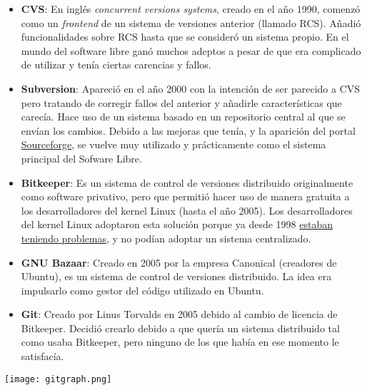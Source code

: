 \begin{itemize}
    \item \textbf{CVS}: En inglés \textit{concurrent versions systems}, creado en el año 1990, comenzó como un \textit{frontend} de un sistema de versiones anterior (llamado RCS). Añadió funcionalidades sobre RCS hasta que se consideró un sistema propio. En el mundo del software libre ganó muchos adeptos a pesar de que era complicado de utilizar y tenía ciertas carencias y fallos.

    \item \textbf{Subversion}: Apareció en el año 2000 con la intención de ser parecido a CVS pero tratando de corregir fallos del anterior y añadirle características que carecía. Hace uso de un sistema basado en un repositorio central al que se envían los cambios. Debido a las mejoras que tenía, y la aparición del portal \href{https://sourceforge.net/}{Sourceforge}, se vuelve muy utilizado y prácticamente como el sistema principal del Sofware Libre.

    \item \textbf{Bitkeeper}: Es un sistema de control de versiones distribuido originalmente como software privativo, pero que permitió hacer uso de manera gratuita a los desarrolladores del kernel Linux (hasta el año 2005). Los desarrolladores del kernel Linux adoptaron esta solución porque ya desde 1998 \href{https://lkml.org/lkml/1998/9/30/122}{estaban teniendo problemas}, y no podían adoptar un sistema centralizado.

    \item \textbf{GNU Bazaar}: Creado en 2005 por la empresa Canonical (creadores de Ubuntu), es un sistema de control de versiones distribuido. La idea era impulsarlo como gestor del código utilizado en Ubuntu.

    \item \textbf{Git}: Creado por Linus Torvalds en 2005 debido al cambio de licencia de Bitkeeper. Decidió crearlo debido a que quería un sistema distribuido tal como usaba Bitkeeper, pero ninguno de los que había en ese momento le satisfacía.
\end{itemize}

\begin{center}
    \texttt{[image: gitgraph.png]}
\end{center}

